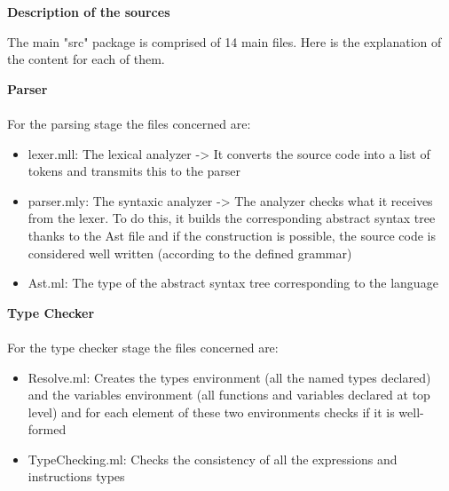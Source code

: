 \documentclass[11pt]{report}
\begin{document}
\newpage
{}
{} 
\centerline{\textbf{\Huge Description of the sources}}
\vspace*{3pt}
\vspace*{20pt}

\tabto{1cm} The main "src" package is comprised of 14 main files. Here is the explanation of the content for each of them.

\vspace*{10pt}
{} 
\tabto{0cm} {\LARGE \textbf{Parser}}
\\ \\
For the parsing stage the files concerned are:
\begin{itemize}
\item lexer.mll: The lexical analyzer -> It converts the source code into a list of tokens and transmits this to the parser
\item parser.mly: The syntaxic analyzer -> The analyzer checks what it receives from the lexer. To do this, it builds the corresponding abstract syntax tree thanks to the Ast file and if the construction is possible, the source code is considered well written (according to the defined grammar)
\item Ast.ml: The type of the abstract syntax tree corresponding to the language
\end{itemize}

{} 
\tabto{0cm} {\LARGE \textbf{Type Checker}}
\\ \\
For the type checker stage the files concerned are:
\begin{itemize}
\item Resolve.ml: Creates the types environment (all the named types declared) and the variables environment (all functions and variables declared at top level) and for each element of these two environments checks if it is well-formed
\item TypeChecking.ml: Checks the consistency of all the expressions and instructions types
\end{itemize}
\end{document}
